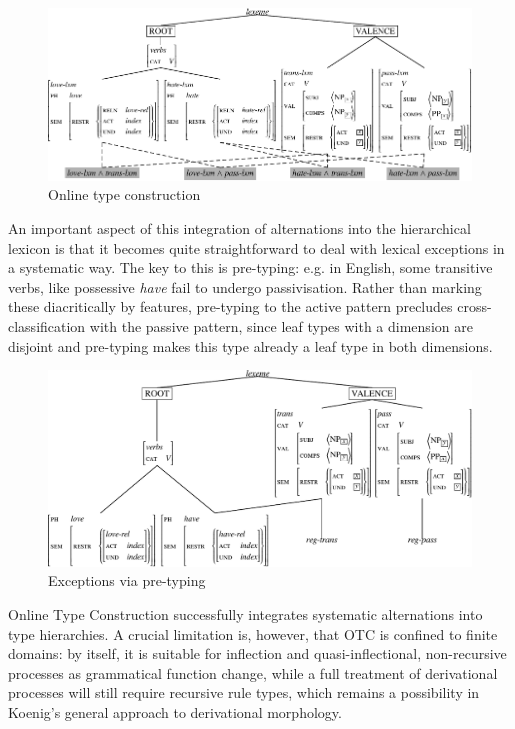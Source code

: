 \begin{figure}[htb]
  \centering
  \includegraphics[scale=.84]{figures/OTC-crop.pdf}
  
  \caption{Online type construction}
  \label{fig:KoenigDyn}
\end{figure}

An important aspect of this integration of alternations
into the hierarchical lexicon is that it becomes quite straightforward 
to deal with lexical exceptions in a systematic way. The key to this
is pre-typing: e.g. in English, some transitive verbs, like possessive
\textit{have} fail to undergo passivisation. Rather than marking these
diacritically by features, pre-typing to the active pattern precludes
cross-classification with the passive pattern, since leaf types with a
dimension are disjoint and pre-typing makes this type already a leaf
type in both dimensions. 

\begin{figure}[htb]
  \centering
  \includegraphics[scale=.64]{figures/pretyping-crop.pdf}

  \caption{Exceptions via pre-typing}
  \label{fig:KoenigPre}
\end{figure}




Online Type Construction successfully integrates systematic
alternations into type hierarchies. A crucial limitation is, however,
that OTC is confined to finite domains: by itself, it is suitable for
inflection and quasi-inflectional, non-recursive processes as
grammatical function change, while a full treatment of derivational
processes will still require recursive rule types, which remains a
possibility in Koenig's general approach to derivational morphology. 

